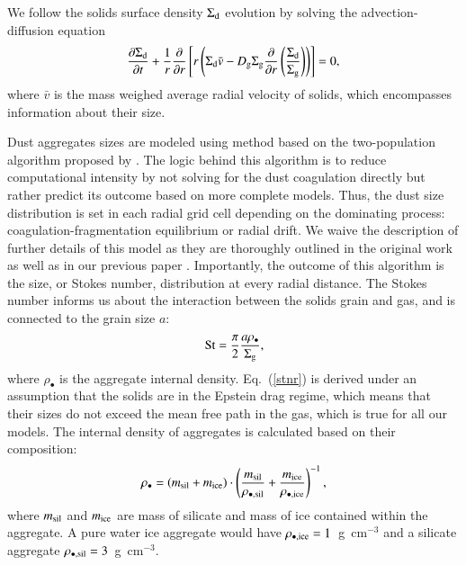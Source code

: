 \documentclass{aa}
\begin{document}
We follow the solids surface density $\Sigma_{\rm d}$ evolution by solving the advection-diffusion equation
\begin{equation}\label{advdiff}
\frac{\partial \Sigma_{\rm d}}{\partial t} + \frac{1}{r} \frac{\partial}{\partial r}\left[r\left(\Sigma_{\rm d}\bar{v}-D_{\rm g}\Sigma_{\rm g}\frac{\partial}{\partial r}\left(\frac{\Sigma_{\rm d}}{\Sigma_{\rm g}}\right)\right)\right] = 0,
\end{equation}
where $\bar{v}$ is the mass weighed average radial velocity of solids, which encompasses information about their size.

Dust aggregates sizes are modeled using method based on the two-population algorithm proposed by \citet{2012A&A...539A.148B}. The logic behind this algorithm is to reduce computational intensity by not solving for the dust coagulation directly but rather predict its outcome based on more complete models. Thus, the dust size distribution is set in each radial grid cell depending on the dominating process: coagulation-fragmentation equilibrium or radial drift. We waive the description of further details of this model as they are thoroughly outlined in the original work as well as in our previous paper \citep{2016A&A...594A.105D}. Importantly, the outcome of this algorithm is the size, or Stokes number, distribution at every radial distance. The Stokes number informs us about the interaction between the solids grain and gas, and is connected to the grain size $a$:
\begin{equation}\label{stnr}
{\rm{St}} = \frac{\pi}{2}\frac{a\rho_{\bullet}}{\Sigma_{\rm{g}}},
\end{equation}
where $\rho_{\bullet}$ is the aggregate internal density. Eq.~(\ref{stnr}) is derived under an assumption that the solids are in the Epstein drag regime, which means that their sizes do not exceed the mean free path in the gas, which is true for all our models. The internal density of aggregates is calculated based on their composition:
\begin{equation}\label{rhop}
\rho_{\bullet} = \left(m_{\rm sil}+m_{\rm ice}\right)\cdot\left({\frac{m_{\rm sil}}{\rho_{\bullet,{\rm sil}}}+\frac{m_{\rm ice}}{\rho_{\bullet,{\rm ice}}}}\right)^{-1},
\end{equation}
where $m_{\rm sil}$ and $m_{\rm ice}$ are mass of silicate and mass of ice contained within the aggregate.
A pure water ice aggregate would have $\rho_{\bullet,{\rm ice}}=1$~g~cm$^{-3}$ and a silicate aggregate $\rho_{\bullet,{\rm sil}}=3$~g~cm$^{-3}$.
\end{document}
